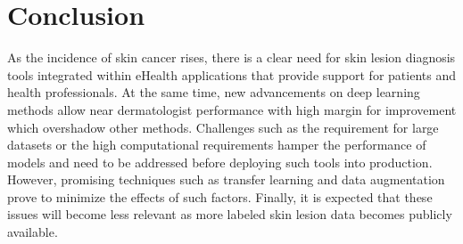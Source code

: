 \documentclass[journal,compsoc]{IEEEtran}
\begin{document}
\section{Conclusion}
As the incidence of skin cancer rises, there is a clear need for skin lesion diagnosis tools integrated within eHealth applications that provide support for patients and health professionals. At the same time, new advancements on deep learning methods allow near dermatologist performance with high margin for improvement which overshadow other methods. Challenges such as the requirement for large datasets or the high computational requirements hamper the performance of models and need to be addressed before deploying such tools into production. However, promising techniques such as transfer learning and data augmentation prove to minimize the effects of such factors. Finally, it is expected that these issues will become less relevant as more labeled skin lesion data becomes publicly available.






%
%
%



\end{document}
